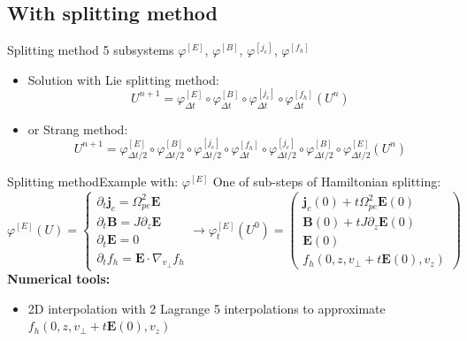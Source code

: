 \documentclass{beamer}
\newcommand{\mbold}[1]{{\textbf{\color{PLB}#1}}}
\newcommand{\Mvb}[1]{\boldsymbol{#1}}
\begin{document}
\subsection{With splitting method}
\begin{frame}{Splitting method}
  5 subsystems $\varphi^{[E]}$, $\varphi^{[B]}$, $\varphi^{[j_c]}$, $\varphi^{[f_h]}$


  \begin{itemize}
    \item Solution with Lie splitting method:
      $$
        U^{n+1} = \varphi_{\Delta t}^{[E]}
            \circ \varphi_{\Delta t}^{[B]}
            \circ \varphi_{\Delta t}^{[j_c]}
            \circ \varphi_{\Delta t}^{[f_h]} (U^n)
      $$
    \item or Strang method:
      $$
        U^{n+1} = \varphi_{\Delta t/2}^{[E]}
            \circ \varphi_{\Delta t/2}^{[B]}
            \circ \varphi_{\Delta t/2}^{[j_c]}
            \circ \varphi_{\Delta t}^{[f_h]}
            \circ \varphi_{\Delta t/2}^{[j_c]}
            \circ \varphi_{\Delta t/2}^{[B]}
            \circ \varphi_{\Delta t/2}^{[E]} (U^n)
      $$
  \end{itemize}
\end{frame}
\begin{frame}{Splitting method}{Example with: $\varphi^{[E]}$}
  One of sub-steps of Hamiltonian splitting:
  $$
    \varphi^{[E]}(U) =
    \begin{cases}
      \partial_t \Mvb{j}_c = \Omega_{pe}^2\Mvb{E} \\
      \partial_t \Mvb{B} = J\partial_z\Mvb{E} \\
      \partial_t \Mvb{E} = 0 \\
      \partial_t f_h = \Mvb{E}\cdot\nabla_{v_\perp}f_h
    \end{cases}
    \rightarrow
    \varphi_{t}^{[E]}(U^0) = \begin{pmatrix}
      \Mvb{j}_c(0) + t\Omega_{pe}^2\Mvb{E}(0) \\
      \Mvb{B}(0) + tJ\partial_z\Mvb{E}(0) \\
      \Mvb{E}(0) \\
      f_h(0,z,v_\perp\!+t\Mvb{E}(0),v_z)
    \end{pmatrix}
  $$
  \mbold{Numerical tools:}
  \begin{itemize}
    \item 2D interpolation with 2 Lagrange 5 interpolations to approximate $f_h(0,z,v_\perp+t\Mvb{E}(0),v_z)$
  \end{itemize}
\end{frame}
\end{document}
